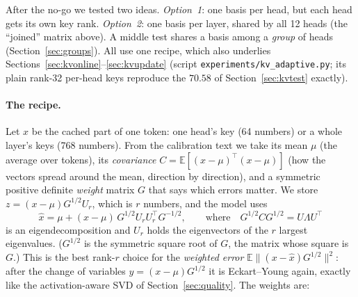\documentclass[10pt]{article}
\theoremstyle{plain}
\theoremstyle{definition}
\theoremstyle{remark}
\newcommand{\E}{\mathbb{E}}
\newcommand{\T}{^{\top}}
\begin{document}
After the no-go we tested two ideas. \emph{Option~1}: one basis per head, but each head gets its own key rank. \emph{Option~2}: one basis per layer, shared by all 12 heads (the ``joined'' matrix above). A middle test shares a basis among a \emph{group} of heads (Section~\ref{sec:groups}). All use one recipe, which also underlies Sections~\ref{sec:kvonline}--\ref{sec:kvupdate} (script \texttt{experiments/kv\_adaptive.py}; its plain rank-32 per-head keys reproduce the $70.58$ of Section~\ref{sec:kvtest} exactly).

\paragraph{The recipe.}
Let $x$ be the cached part of one token: one head's key (64 numbers) or a whole layer's keys (768 numbers). From the calibration text we take its mean $\mu$ (the average over tokens), its \emph{covariance} $C=\E[(x-\mu)\T(x-\mu)]$ (how the vectors spread around the mean, direction by direction), and a symmetric positive definite \emph{weight} matrix $G$ that says which errors matter. We store $z=(x-\mu)G^{1/2}U_r$, which is $r$ numbers, and the model uses
\begin{equation}\label{eq:recipe}
\hat x=\mu+(x-\mu)\,G^{1/2}U_rU_r\T G^{-1/2},\qquad\text{where}\quad G^{1/2}CG^{1/2}=U\Lambda U\T
\end{equation}
is an eigendecomposition and $U_r$ holds the eigenvectors of the $r$ largest eigenvalues. ($G^{1/2}$ is the symmetric square root of $G$, the matrix whose square is $G$.) This is the best rank-$r$ choice for the \emph{weighted error} $\E\lVert(x-\hat x)G^{1/2}\rVert^2$: after the change of variables $y=(x-\mu)G^{1/2}$ it is Eckart--Young again, exactly like the activation-aware SVD of Section~\ref{sec:quality}. The weights are:
\end{document}
